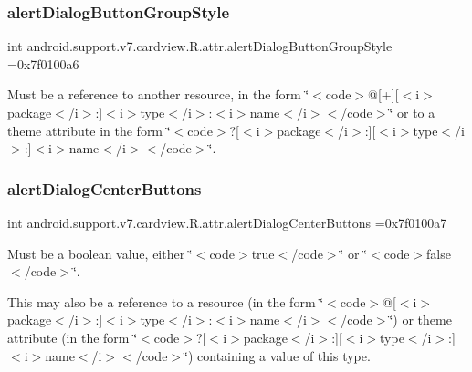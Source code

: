 \subsubsection{\texorpdfstring{alert\+Dialog\+Button\+Group\+Style}{alertDialogButtonGroupStyle}}
{\footnotesize\ttfamily int android.\+support.\+v7.\+cardview.\+R.\+attr.\+alert\+Dialog\+Button\+Group\+Style =0x7f0100a6\hspace{0.3cm}{\ttfamily [static]}}

Must be a reference to another resource, in the form \char`\"{}$<$code$>$@\mbox{[}+\mbox{]}\mbox{[}$<$i$>$package$<$/i$>$\+:\mbox{]}$<$i$>$type$<$/i$>$\+:$<$i$>$name$<$/i$>$$<$/code$>$\char`\"{} or to a theme attribute in the form \char`\"{}$<$code$>$?\mbox{[}$<$i$>$package$<$/i$>$\+:\mbox{]}\mbox{[}$<$i$>$type$<$/i$>$\+:\mbox{]}$<$i$>$name$<$/i$>$$<$/code$>$\char`\"{}. \mbox{\label{classandroid_1_1support_1_1v7_1_1cardview_1_1R_1_1attr_ae6d278326b134950f9bdf16085f24854}} 
\subsubsection{\texorpdfstring{alert\+Dialog\+Center\+Buttons}{alertDialogCenterButtons}}
{\footnotesize\ttfamily int android.\+support.\+v7.\+cardview.\+R.\+attr.\+alert\+Dialog\+Center\+Buttons =0x7f0100a7\hspace{0.3cm}{\ttfamily [static]}}

Must be a boolean value, either \char`\"{}$<$code$>$true$<$/code$>$\char`\"{} or \char`\"{}$<$code$>$false$<$/code$>$\char`\"{}. 

This may also be a reference to a resource (in the form \char`\"{}$<$code$>$@\mbox{[}$<$i$>$package$<$/i$>$\+:\mbox{]}$<$i$>$type$<$/i$>$\+:$<$i$>$name$<$/i$>$$<$/code$>$\char`\"{}) or theme attribute (in the form \char`\"{}$<$code$>$?\mbox{[}$<$i$>$package$<$/i$>$\+:\mbox{]}\mbox{[}$<$i$>$type$<$/i$>$\+:\mbox{]}$<$i$>$name$<$/i$>$$<$/code$>$\char`\"{}) containing a value of this type. \mbox{\label{classandroid_1_1support_1_1v7_1_1cardview_1_1R_1_1attr_a0d798a0d9dc93b5d065cce12a60d5a02}} 
